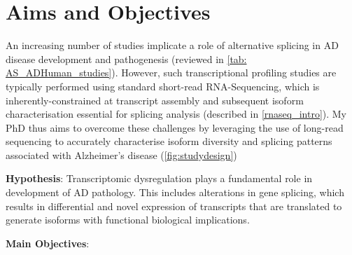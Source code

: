 \newpage
\section{Aims and Objectives}
An increasing number of studies implicate a role of alternative splicing in AD disease development and pathogenesis (reviewed in \cref{tab: AS_ADHuman_studies}). However, such transcriptional profiling studies are typically performed using standard short-read RNA-Sequencing, which is inherently-constrained at transcript assembly and subsequent isoform characterisation essential for splicing analysis (described in \cref{rnaseq_intro}). My PhD thus aims to overcome these challenges by leveraging the use of long-read sequencing to accurately characterise isoform diversity and splicing patterns associated with Alzheimer's disease (\cref{fig:studydesign})


\textbf{Hypothesis}: Transcriptomic dysregulation plays a fundamental role in development of AD pathology. This includes alterations in gene splicing, which results in differential and novel expression of transcripts that are translated to generate isoforms with functional biological implications. 

\textbf{Main Objectives}:

